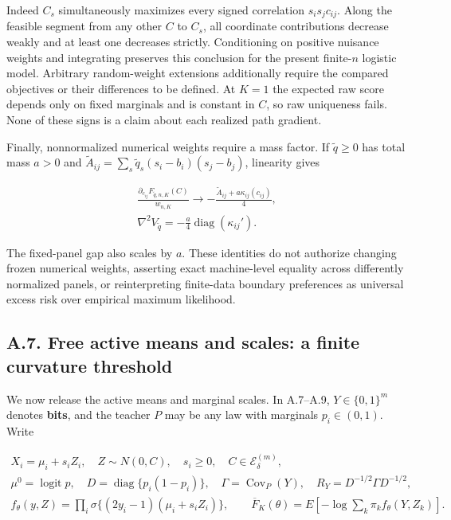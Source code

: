 \documentclass{article}
\begin{document}
Indeed \(C_s\) simultaneously maximizes every signed correlation
\(s_is_jc_{ij}\). Along the feasible segment from any other \(C\) to
\(C_s\), all coordinate contributions decrease weakly and at least one
decreases strictly. Conditioning on positive nuisance weights and
integrating preserves this conclusion for the present finite-\(n\)
logistic model. Arbitrary random-weight extensions additionally require
the compared objectives or their differences to be defined. At \(K=1\)
the expected raw score depends only on fixed marginals and is constant
in \(C\), so raw uniqueness fails. None of these signs is a claim about
each realized path gradient.

Finally, nonnormalized numerical weights require a mass factor. If
\(\widetilde q\ge0\) has total mass \(a>0\) and
\(\widetilde A_{ij}=\sum_s\widetilde q_s(s_i-b_i)(s_j-b_j)\), linearity
gives

\[
\begin{gathered}
\frac{\partial_{c_{ij}}F_{\widetilde q,n,K}(C)}{w_{n,K}}
\longrightarrow-\frac{\widetilde A_{ij}+a\kappa_{ij}(c_{ij})}{4},\\
\nabla^2V_{\widetilde q}=-\frac a4\operatorname{diag}(\kappa_{ij}').
\end{gathered}
\tag{A.36}
\]

The fixed-panel gap also scales by \(a\). These identities do not
authorize changing frozen numerical weights, asserting exact
machine-level equality across differently normalized panels, or
reinterpreting finite-data boundary preferences as universal excess risk
over empirical maximum likelihood.

\subsection*{A.7. Free active means and scales: a finite curvature
threshold}\label{a.7.-free-active-means-and-scales-a-finite-curvature-threshold}

We now release the active means and marginal scales. In A.7--A.9,
\(Y\in\{0,1\}^m\) denotes \textbf{bits}, and the teacher \(P\) may be
any law with marginals \(p_i\in(0,1)\). Write

\[
\begin{gathered}
X_i=\mu_i+s_iZ_i,\quad Z\sim N(0,C),\quad s_i\ge0,\quad C\in\mathcal E_\delta^{(m)},\\
\mu^0=\operatorname{logit}p,\quad D=\operatorname{diag}\{p_i(1-p_i)\},\quad
\Gamma=\operatorname{Cov}_P(Y),\quad R_Y=D^{-1/2}\Gamma D^{-1/2},\\
f_\theta(y,Z)=\prod_i\sigma\{(2y_i-1)(\mu_i+s_iZ_i)\},\qquad
\overline F_K(\theta)=E[-\log\sum_k\pi_k f_\theta(Y,Z_k)].
\end{gathered}
\tag{A.37}
\]
\end{document}

